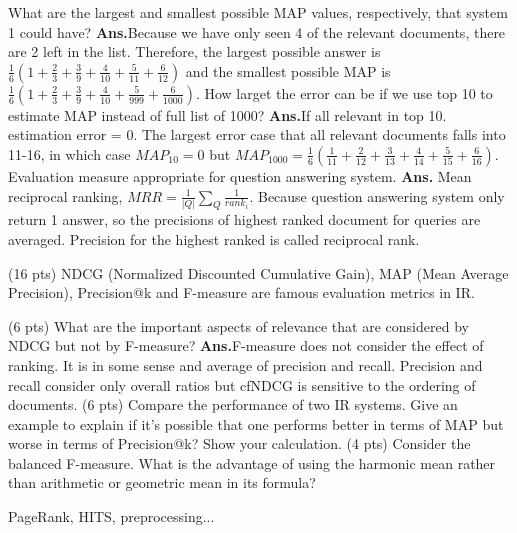 \documentclass[11pt]{exam}
\newcommand{\ans}{\textbf{Ans.}}
\begin{document}
\begin{questions}
\begin{subparts}
  \subpart What are the largest and smallest possible MAP values, respectively, 
  that system 1 could have? \ans Because we have only seen 4 of the relevant 
  documents, there are 2 left in the list. Therefore, the largest possible 
  answer is $\frac{1}{6}(1+\frac{2}{3} 
  +\frac{3}{9}+\frac{4}{10}+\frac{5}{11}+\frac{6}{12})$ and the smallest 
  possible MAP is $\frac{1}{6}(1+\frac{2}{3} 
  +\frac{3}{9}+\frac{4}{10}+\frac{5}{999}+\frac{6}{1000})$.
  \subpart How larget the error can be if we use top 10 to estimate MAP instead 
  of full list of 1000? \ans If all relevant in top 10. estimation error = 0. 
  The largest error case that all relevant documents falls into 11-16, in which 
  case $MAP_{10} = 0$ but 
  $MAP_{1000}=\frac{1}{6}(\frac{1}{11}+\frac{2}{12}+\frac{3}{13}+\frac{4}{14}+\frac{5}{15}+\frac{6}{16})$.
  \subpart Evaluation measure appropriate for question answering system. \ans 
  Mean reciprocal ranking, $MRR=\frac{1}{|Q|}\sum_Q \frac{1}{rank_i}$. Because 
  question answering system only return 1 answer, so the precisions of highest 
  ranked document for queries are averaged. Precision for the highest ranked is 
  called reciprocal rank.
\end{subparts}
\question (16 pts) NDCG (Normalized Discounted Cumulative Gain), MAP (Mean Average Precision), Precision@k and F-measure are famous evaluation metrics in IR.
\begin{subparts}
\subpart (6 pts) What are the important aspects of relevance that are considered by NDCG but not by F-measure?
\ans F-measure does not consider the effect of ranking. It is in some sense and average of precision and recall.
Precision and recall consider only overall ratios but cfNDCG is sensitive to the ordering of documents.
\subpart (6 pts) Compare the performance of two IR systems. Give an example to explain if it’s possible that one performs better in terms of MAP but worse in terms of Precision@k? Show your calculation.
\subpart (4 pts) Consider the balanced F-measure. What is the advantage of using the harmonic mean rather than arithmetic or geometric mean in its formula?
\end{subparts} 
\end{questions}
PageRank, HITS, preprocessing...
\end{document}
